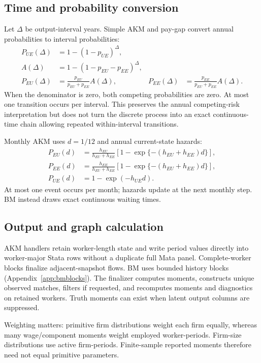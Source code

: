 \documentclass[11pt,letterpaper]{article}
\begin{document}
\subsection{Time and probability conversion}\label{app:rates}
Let $\Delta$ be output-interval years. Simple AKM and pay-gap convert
annual probabilities to interval probabilities:
\begin{align}
P_{UE}(\Delta)&=1-(1-p_{UE})^\Delta,\\
A(\Delta)&=1-(1-p_{EU}-p_{EE})^\Delta,\\
P_{EU}(\Delta)&=\frac{p_{EU}}{p_{EU}+p_{EE}}A(\Delta),&
P_{EE}(\Delta)&=\frac{p_{EE}}{p_{EU}+p_{EE}}A(\Delta).
\end{align}
When the denominator is zero, both competing probabilities are zero.
At most one transition occurs per interval. This preserves the annual
competing-risk interpretation but does not turn the discrete process into
an exact continuous-time chain allowing repeated within-interval transitions.

Monthly AKM uses $d=1/12$ and annual current-state hazards:
\begin{align}
P_{EU}(d)&=\frac{h_{EU}}{h_{EU}+h_{EE}}
 [1-\exp\{-(h_{EU}+h_{EE})d\}],\\
P_{EE}(d)&=\frac{h_{EE}}{h_{EU}+h_{EE}}
 [1-\exp\{-(h_{EU}+h_{EE})d\}],\\
P_{UE}(d)&=1-\exp(-h_{UE}d).
\end{align}
At most one event occurs per month; hazards update at the next monthly
step. BM instead draws exact continuous waiting times.

\subsection{Output and graph calculation}
AKM handlers retain worker-length state and write period values directly
into worker-major Stata rows without a duplicate full Mata panel.
Complete-worker blocks finalize adjacent-snapshot flows.
BM uses bounded history blocks (Appendix~\ref{app:bmblocks}).
The finalizer computes moments, constructs unique observed matches,
filters if requested, and recomputes moments and diagnostics on retained
workers. Truth moments can exist when latent output columns are suppressed.

Weighting matters: primitive firm distributions weight each firm equally,
whereas many wage/component moments weight employed worker-periods.
Firm-size distributions use active firm-periods. Finite-sample reported
moments therefore need not equal primitive parameters.
\end{document}
